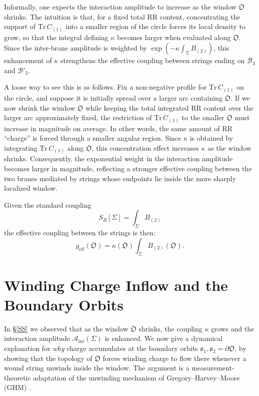 \documentclass{article}
\numberwithin{tm}{section}
\numberwithin{dn}{section}
\numberwithin{as}{section}
\numberwithin{rk}{section}
\numberwithin{lem}{section}
\numberwithin{ax}{section}
\numberwithin{pp}{section}
\numberwithin{eg}{section}
\numberwithin{war}{section}
\numberwithin{equation}{section}
\numberwithin{prop}{section}
\numberwithin{nt}{section}
\numberwithin{rc}{section}
\numberwithin{setup}{section}
\begin{document}
Informally, one expects the interaction amplitude to increase as the window $\mathfrak{O}$ shrinks. The intuition is that, for a fixed total RR content, concentrating the support of $\mathrm{Tr}\,C_{(1)}$ into a smaller region of the circle forces its local density to grow, so that the integral defining $\kappa$ becomes larger when evaluated along $\mathfrak{O}$. Since the inter-brane amplitude is weighted by $\exp(-\kappa \int_{\Sigma} B_{(2)})$, this enhancement of $\kappa$ strengthens the effective coupling between strings ending on $\mathcal{B}_3$ and $\mathcal{B}'_3$.

A loose way to see this is as follows. Fix a non-negative profile for $\mathrm{Tr}\,C_{(1)}$ on the circle, and suppose it is initially spread over a larger arc containing $\mathfrak{O}$. If we now shrink the window $\mathfrak{O}$ while keeping the total integrated RR content over the larger arc approximately fixed, the restriction of $\mathrm{Tr}\,C_{(1)}$ to the smaller $\mathfrak{O}$ must increase in magnitude on average. In other words, the same amount of RR ``charge'' is forced through a smaller angular region. Since $\kappa$ is obtained by integrating $\mathrm{Tr}\,C_{(1)}$ along $\mathfrak{O}$, this concentration effect increases $\kappa$ as the window shrinks. Consequently, the exponential weight in the interaction amplitude becomes larger in magnitude, reflecting a stronger effective coupling between the two branes mediated by strings whose endpoints lie inside the more sharply localized window. 

Given the standard coupling \cite{Tseytlin}
\begin{equation}
	S_B[\Sigma] = \int_{\Sigma} B_{(2)}
\end{equation}
the effective coupling between the strings is then:
\begin{equation}
	g_{\mathrm{eff}} (\mathfrak{O}) = \kappa (\mathfrak{O}) \int_\Sigma B_{(2)} (\mathfrak{O}).
\end{equation}

\section{Winding Charge Inflow and the Boundary Orbits} \label{winding}

In \S\ref*{SS} we observed that as the window $\mathfrak{O}$ shrinks, the coupling $\kappa$ grows and the interaction amplitude $\mathcal{A}_{\mathrm{int}}(\Sigma)$ is enhanced. We now give a dynamical explanation for \emph{why} charge accumulates at the boundary orbits $\mathfrak{o}_1, \mathfrak{o}_2 = \partial\mathfrak{O}$, by showing that the topology of $\mathfrak{O}$ forces winding charge to flow there whenever a wound string unwinds inside the window. The argument is a measurement-theoretic adaptation of the unwinding mechanism of Gregory--Harvey--Moore (GHM) \cite{GHM}.
\end{document}
